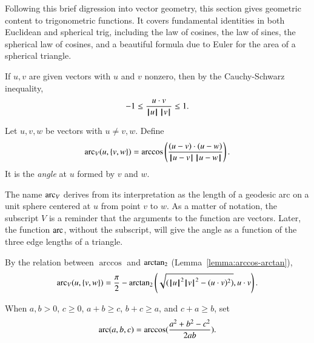 Following this brief digression into vector geometry, this section
gives geometric content to trigonometric functions.
It covers fundamental identities
in both Euclidean and spherical trig, including the law
of cosines, the law of sines, the spherical law of cosines, 
and a beautiful formula due to Euler for
the area of a spherical triangle.

If $u,v$ are given vectors with $u$ and $v$ nonzero, then by the
Cauchy-Schwarz inequality,
    $$-1 \le \frac{u\cdot v}{{{\hskip0.1em|\hskip-0.15em|\hskip0.1em}u{\hskip0.1em|\hskip-0.15em|\hskip0.1em}}\,{{\hskip0.1em|\hskip-0.15em|\hskip0.1em}v{\hskip0.1em|\hskip-0.15em|\hskip0.1em}}} \le 1.$$

\begin{definition}\label{def:angle}
Let $u,v,w$ be vectors with $u\ne v,w$.
Define
    $$
    \operatorname{arc}_V(u,\{v,w\}) = \arccos\left(\frac{(u-v)\cdot (u-w)}{{\hskip0.1em|\hskip-0.15em|\hskip0.1em}u - v{\hskip0.1em|\hskip-0.15em|\hskip0.1em}\,{\hskip0.1em|\hskip-0.15em|\hskip0.1em}u - w{\hskip0.1em|\hskip-0.15em|\hskip0.1em}}\right).
    $$
It is the {\it angle} at $u$ formed by $v$ and $w$.
\end{definition}

The name $\operatorname{arc}_V$ derives from its interpretation as the
length of a geodesic arc on a unit sphere
centered at $u$ from point $v$ to $w$.
As a matter of notation, the subscript $V$ is a reminder that
the arguments to the function are vectors.  Later, the function
$\operatorname{arc}$, without the subscript, will give the angle as a function
of the three edge lengths of a triangle.




By the relation between $\arccos$ and ${\operatorname{arctan_2}}$
(Lemma~\ref{lemma:arccos-arctan}), %
    \begin{equation}\label{eqn:angle}
    \operatorname{arc}_V(u,\{v,w\}) = \frac{\pi}2 - {\operatorname{arctan_2}}\left ({\sqrt{({{\hskip0.1em|\hskip-0.15em|\hskip0.1em}u{\hskip0.1em|\hskip-0.15em|\hskip0.1em}}^2{{\hskip0.1em|\hskip-0.15em|\hskip0.1em}v{\hskip0.1em|\hskip-0.15em|\hskip0.1em}}^2 -
    (u\cdot v)^2)}}, {u\cdot v}\right).
    \end{equation}

\begin{definition}[arc]
When $a,b>0$, $c\ge0$,  $a + b \ge c$, $b + c \ge a$, 
and $c+a \ge b$, set 
 $$\operatorname{arc}(a,b,c) = \arccos(\frac{a^2 + b^2 - c^2}{2 a b}).$$
\end{definition}


